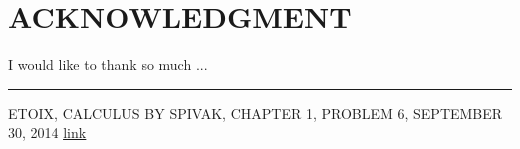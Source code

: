 \documentclass[letterpaper, 10 pt, conference]{ieeeconf}  %
\begin{document}
\newpage

\section*{ACKNOWLEDGMENT}
I would like to thank so much ...

\noindent\rule{8cm}{0.4pt}

\begin{thebibliography}{99}

 ETOIX, CALCULUS BY SPIVAK, CHAPTER 1, PROBLEM 6, SEPTEMBER 30, 2014 \href{https://etoix.wordpress.com/2014/09/30/calculus-by-spivak-chapter-1-problem-6/}{\underline{link}}
\end{thebibliography}
\end{document}
